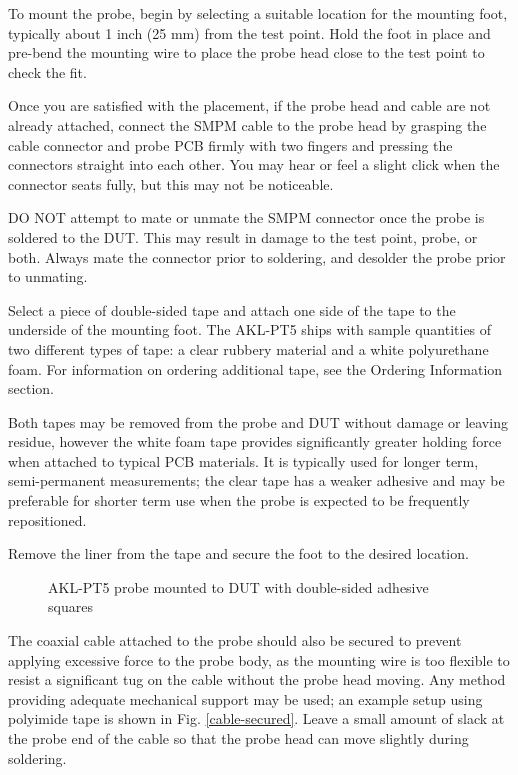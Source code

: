 \documentclass[11pt]{article}
\begin{document}
To mount the probe, begin by selecting a suitable location for the mounting foot, typically about 1 inch (25 mm) from
the test point. Hold the foot in place and pre-bend the mounting wire to place the probe head close to the test point
to check the fit.

Once you are satisfied with the placement, if the probe head and cable are not already attached, connect the SMPM cable
to the probe head by grasping the cable connector and probe PCB firmly with two fingers and pressing the connectors
straight into each other. You may hear or feel a slight click when the connector seats fully, but this may not be
noticeable.

DO NOT attempt to mate or unmate the SMPM connector once the probe is soldered to the DUT. This may result in damage to
the test point, probe, or both. Always mate the connector prior to soldering, and desolder the probe prior to unmating.

Select a piece of double-sided tape and attach one side of the tape to the underside of the mounting foot. The AKL-PT5
ships with sample quantities of two different types of tape: a clear rubbery material and a white polyurethane foam.
For information on ordering additional tape, see the Ordering Information section.

Both tapes may be removed from the probe and DUT without damage or leaving residue, however the white foam tape
provides significantly greater holding force when attached to typical PCB materials. It is typically used for longer
term, semi-permanent measurements; the clear tape has a weaker adhesive and may be preferable for shorter term use when
the probe is expected to be frequently repositioned.

Remove the liner from the tape and secure the foot to the desired location.

\begin{figure}[h]
\centering
\caption{AKL-PT5 probe mounted to DUT with double-sided adhesive squares}
\label{secured-tip}
\end{figure}

The coaxial cable attached to the probe should also be secured to prevent applying excessive force to the probe body,
as the mounting wire is too flexible to resist a significant tug on the cable without the probe head moving. Any method
providing adequate mechanical support may be used; an example setup using polyimide tape is shown in Fig.
\ref{cable-secured}. Leave a small amount of slack at the probe end of the cable so that the probe head can move
slightly during soldering.
\end{document}
